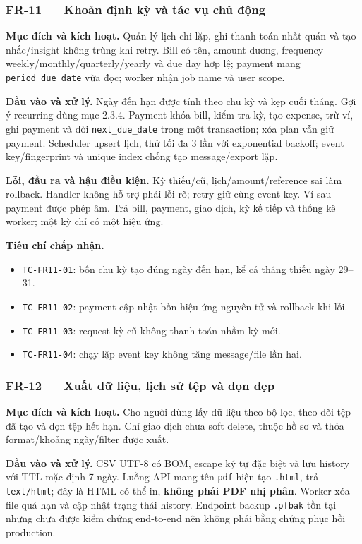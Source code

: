 \subsubsection{FR-11 --- Khoản định kỳ và tác vụ chủ động}

\textbf{Mục đích và kích hoạt.} Quản lý lịch chi lặp, ghi thanh toán nhất quán và tạo nhắc/insight không trùng khi retry. Bill có tên, amount dương, frequency weekly/monthly/quarterly/yearly và due day hợp lệ; payment mang \texttt{period\_due\_date} vừa đọc; worker nhận job name và user scope.

\textbf{Đầu vào và xử lý.} Ngày đến hạn được tính theo chu kỳ và kẹp cuối tháng. Gợi ý recurring dùng mục 2.3.4. Payment khóa bill, kiểm tra kỳ, tạo expense, trừ ví, ghi payment và dời \texttt{next\_due\_date} trong một transaction; xóa plan vẫn giữ payment. Scheduler upsert lịch, thử tối đa 3 lần với exponential backoff; event key/fingerprint và unique index chống tạo message/export lặp.

\textbf{Lỗi, đầu ra và hậu điều kiện.} Kỳ thiếu/cũ, lịch/amount/reference sai làm rollback. Handler không hỗ trợ phải lỗi rõ; retry giữ cùng event key. Ví sau payment được phép âm. Trả bill, payment, giao dịch, kỳ kế tiếp và thống kê worker; một kỳ chỉ có một hiệu ứng.

\textbf{Tiêu chí chấp nhận.}
\begin{itemize}
  \item \texttt{TC-FR11-01}: bốn chu kỳ tạo đúng ngày đến hạn, kể cả tháng thiếu ngày 29--31.
  \item \texttt{TC-FR11-02}: payment cập nhật bốn hiệu ứng nguyên tử và rollback khi lỗi.
  \item \texttt{TC-FR11-03}: request kỳ cũ không thanh toán nhầm kỳ mới.
  \item \texttt{TC-FR11-04}: chạy lặp event key không tăng message/file lần hai.
\end{itemize}

\subsubsection{FR-12 --- Xuất dữ liệu, lịch sử tệp và dọn dẹp}

\textbf{Mục đích và kích hoạt.} Cho người dùng lấy dữ liệu theo bộ lọc, theo dõi tệp đã tạo và dọn tệp hết hạn. Chỉ giao dịch chưa soft delete, thuộc hồ sơ và thỏa format/khoảng ngày/filter được xuất.

\textbf{Đầu vào và xử lý.} CSV UTF-8 có BOM, escape ký tự đặc biệt và lưu history với TTL mặc định 7 ngày. Luồng API mang tên \texttt{pdf} hiện tạo \texttt{.html}, trả \texttt{text/html}; đây là HTML có thể in, \textbf{không phải PDF nhị phân}. Worker xóa file quá hạn và cập nhật trạng thái history. Endpoint backup \texttt{.pfbak} tồn tại nhưng chưa được kiểm chứng end-to-end nên không phải bằng chứng phục hồi production.

